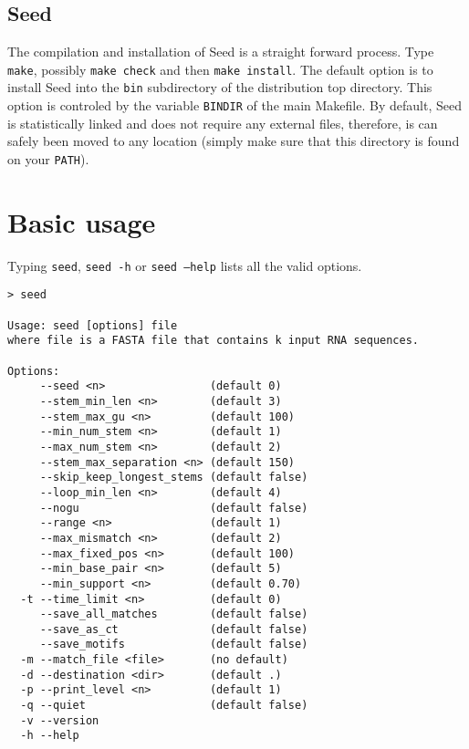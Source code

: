 \documentclass{article}
\begin{document}
\subsection{Seed}

The compilation and installation of Seed is a straight forward
process.  Type \texttt{make}, possibly \texttt{make check} and then
\texttt{make install}.  The default option is to install Seed into the
\texttt{bin} subdirectory of the distribution top directory. This
option is controled by the variable \texttt{BINDIR} of the
main Makefile.  By default, Seed is statistically linked and does not
require any external files, therefore, is can safely been moved to any
location (simply make sure that this directory is found on your
\texttt{PATH}).

\section{Basic usage}

Typing \texttt{seed}, \texttt{seed -h} or \texttt{seed --help} lists
all the valid options.
\begin{verbatim}
> seed

Usage: seed [options] file
where file is a FASTA file that contains k input RNA sequences.
                                                                                                    
Options:
     --seed <n>                (default 0)
     --stem_min_len <n>        (default 3)
     --stem_max_gu <n>         (default 100)
     --min_num_stem <n>        (default 1)
     --max_num_stem <n>        (default 2)
     --stem_max_separation <n> (default 150)
     --skip_keep_longest_stems (default false)
     --loop_min_len <n>        (default 4)
     --nogu                    (default false)
     --range <n>               (default 1)
     --max_mismatch <n>        (default 2)
     --max_fixed_pos <n>       (default 100)
     --min_base_pair <n>       (default 5)
     --min_support <n>         (default 0.70)
  -t --time_limit <n>          (default 0)
     --save_all_matches        (default false)
     --save_as_ct              (default false)
     --save_motifs             (default false)
  -m --match_file <file>       (no default)
  -d --destination <dir>       (default .)
  -p --print_level <n>         (default 1)
  -q --quiet                   (default false)
  -v --version
  -h --help
\end{verbatim}                                                                                                    
\end{document}

